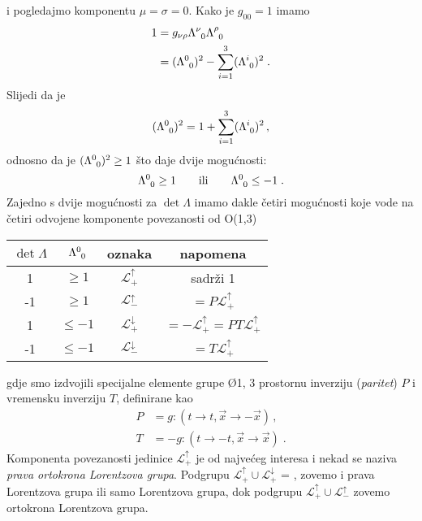 i pogledajmo komponentu $\mu=\sigma=0$. Kako je $g_{00}=1$ imamo
\begin{align}
    1 &= g_{\nu\rho} \tensor{\Lambda}{^{\nu}_{0}} \tensor{\Lambda}{^{\rho}_{0}}  \\
      &= (\tensor{\Lambda}{^{0}_{0}})^2 - \sum_{i=1}^{3}(\tensor{\Lambda}{^{i}_{0}})^2 \;.
\end{align}
Slijedi da je 
\begin{equation}
    (\tensor{\Lambda}{^{0}_{0}})^2 = 1 + \sum_{i=1}^{3}(\tensor{\Lambda}{^{i}_{0}})^2 \,,
\end{equation}
odnosno da je $(\tensor{\Lambda}{^{0}_{0}})^2 \geq 1$ što daje dvije mogućnosti:
\begin{equation}
    \tensor{\Lambda}{^{0}_{0}}\geq 1  \qquad\text{ili}\qquad \tensor{\Lambda}{^{0}_{0}}\leq -1 \;.
\end{equation}
Zajedno s dvije mogućnosti za $\det \Lambda$ imamo dakle četiri mogućnosti koje vode
na četiri odvojene komponente povezanosti od O(1,3)
\begin{center}
\renewcommand{\arraystretch}{1.3}
\begin{tabular}{cccc}
\hline
$\det\Lambda$ & $\tensor{\Lambda}{^{0}_{0}}$ & oznaka & napomena  \\ \hline
    1         &  $\geq 1$   & $\mathcal{L}^{\uparrow}_{+}$ & sadrži 1 \\
 -1           &  $\geq 1$   & $\mathcal{L}^{\uparrow}_{-}$ & 
$= P \mathcal{L}^{\uparrow}_{+} $ \\
 1           &  $\leq -1$   & $\mathcal{L}^{\downarrow}_{+}$ & 
$= - \mathcal{L}^{\uparrow}_{+} = PT \mathcal{L}^{\uparrow}_{+} $\\
 -1           &  $\leq -1$   & $\mathcal{L}^{\downarrow}_{-}$ & 
$= T \mathcal{L}^{\uparrow}_{+} $  \\ \hline
\end{tabular}
\renewcommand{\arraystretch}{1.0}
\end{center}
gdje smo izdvojili specijalne elemente grupe \O{1, 3} 
prostornu inverziju (\emph{paritet}) $P$
i vremensku inverziju $T$, definirane kao
\begin{align}
    P& =g :  (t\to t, \vec{x}\to -\vec{x}) \,, \label{eq:paritet} \\
    T& =-g :  (t\to -t, \vec{x}\to \vec{x})  \;.
\end{align}
Komponenta povezanosti jedinice
$\mathcal{L}^{\uparrow}_{+}$ je od najvećeg interesa i
nekad se naziva \emph{prava ortokrona Lorentzova grupa}.
Podgrupu $\mathcal{L}^{\uparrow}_{+} \cup \mathcal{L}^{\downarrow}_{+}$ = ,
 zovemo i prava Lorentzova grupa ili samo Lorentzova grupa,
dok podgrupu $\mathcal{L}^{\uparrow}_{+} \cup\mathcal{L}^{\uparrow}_{-}$
zovemo ortokrona Lorentzova grupa.


